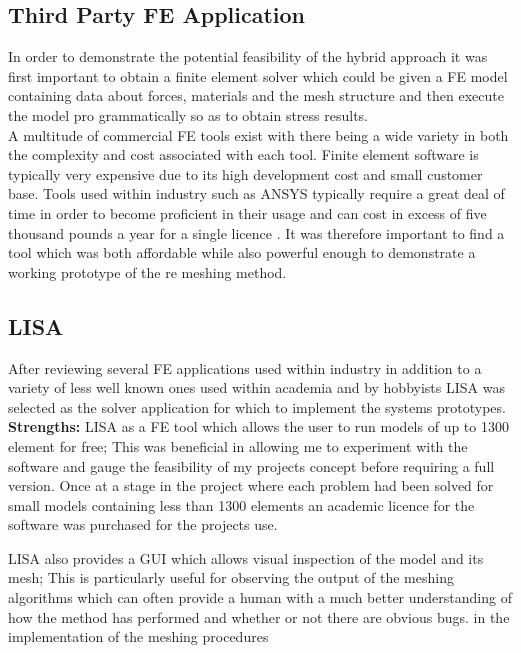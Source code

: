 \documentclass{article}
\begin{document}
\subsection{Third Party FE Application}
In order to demonstrate the potential feasibility of the hybrid approach it was first important to obtain a finite element solver which could be given a FE model containing data about forces, materials and the mesh structure and then execute the model pro grammatically so as to obtain stress results. \\ 

\noindent
A multitude of commercial FE tools exist with there being a wide variety in both the complexity and cost associated with each tool. 
Finite element software is typically very expensive due to its high development cost and small customer base. Tools used within industry such as ANSYS typically require a great deal of time in order to become proficient in their usage and can cost in excess of five thousand pounds a year for a single licence \cite{AnsysCost}. It was therefore important to find a tool which was both affordable while also powerful enough to demonstrate a working prototype of the re meshing method.
 
\subsection{LISA}
After reviewing several FE applications used within industry in addition to a variety of less well known ones used within academia and by hobbyists LISA  was selected as the solver application for which to implement  the systems prototypes. \\ 

\noindent
\textbf{Strengths: }LISA as a FE tool which allows the user to run models of up to 1300 element for free; This was beneficial in allowing me to experiment with the software and gauge the feasibility of my projects concept before requiring a full version. Once at a stage in the project where each problem had been solved for small models containing less than 1300 elements an academic licence for the software was purchased for the projects use.

LISA also provides a GUI which allows visual inspection of the model and its mesh; This is particularly useful for observing the output of the meshing algorithms which can often provide a human with a much better understanding of how the method has performed and whether or not there are obvious bugs. in the implementation of the meshing procedures \\ 
\end{document}
